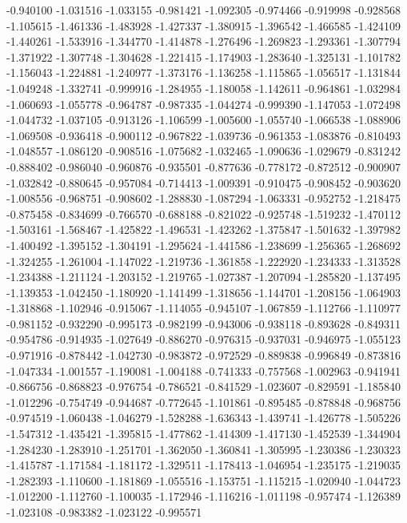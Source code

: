 -0.940100
-1.031516
-1.033155
-0.981421
-1.092305
-0.974466
-0.919998
-0.928568
-1.105615
-1.461336
-1.483928
-1.427337
-1.380915
-1.396542
-1.466585
-1.424109
-1.440261
-1.533916
-1.344770
-1.414878
-1.276496
-1.269823
-1.293361
-1.307794
-1.371922
-1.307748
-1.304628
-1.221415
-1.174903
-1.283640
-1.325131
-1.101782
-1.156043
-1.224881
-1.240977
-1.373176
-1.136258
-1.115865
-1.056517
-1.131844
-1.049248
-1.332741
-0.999916
-1.284955
-1.180058
-1.142611
-0.964861
-1.032984
-1.060693
-1.055778
-0.964787
-0.987335
-1.044274
-0.999390
-1.147053
-1.072498
-1.044732
-1.037105
-0.913126
-1.106599
-1.005600
-1.055740
-1.066538
-1.088906
-1.069508
-0.936418
-0.900112
-0.967822
-1.039736
-0.961353
-1.083876
-0.810493
-1.048557
-1.086120
-0.908516
-1.075682
-1.032465
-1.090636
-1.029679
-0.831242
-0.888402
-0.986040
-0.960876
-0.935501
-0.877636
-0.778172
-0.872512
-0.900907
-1.032842
-0.880645
-0.957084
-0.714413
-1.009391
-0.910475
-0.908452
-0.903620
-1.008556
-0.968751
-0.908602
-1.288830
-1.087294
-1.063331
-0.952752
-1.218475
-0.875458
-0.834699
-0.766570
-0.688188
-0.821022
-0.925748
-1.519232
-1.470112
-1.503161
-1.568467
-1.425822
-1.496531
-1.423262
-1.375847
-1.501632
-1.397982
-1.400492
-1.395152
-1.304191
-1.295624
-1.441586
-1.238699
-1.256365
-1.268692
-1.324255
-1.261004
-1.147022
-1.219736
-1.361858
-1.222920
-1.234333
-1.313528
-1.234388
-1.211124
-1.203152
-1.219765
-1.027387
-1.207094
-1.285820
-1.137495
-1.139353
-1.042450
-1.180920
-1.141499
-1.318656
-1.144701
-1.208156
-1.064903
-1.318868
-1.102946
-0.915067
-1.114055
-0.945107
-1.067859
-1.112766
-1.110977
-0.981152
-0.932290
-0.995173
-0.982199
-0.943006
-0.938118
-0.893628
-0.849311
-0.954786
-0.914935
-1.027649
-0.886270
-0.976315
-0.937031
-0.946975
-1.055123
-0.971916
-0.878442
-1.042730
-0.983872
-0.972529
-0.889838
-0.996849
-0.873816
-1.047334
-1.001557
-1.190081
-1.004188
-0.741333
-0.757568
-1.002963
-0.941941
-0.866756
-0.868823
-0.976754
-0.786521
-0.841529
-1.023607
-0.829591
-1.185840
-1.012296
-0.754749
-0.944687
-0.772645
-1.101861
-0.895485
-0.878848
-0.968756
-0.974519
-1.060438
-1.046279
-1.528288
-1.636343
-1.439741
-1.426778
-1.505226
-1.547312
-1.435421
-1.395815
-1.477862
-1.414309
-1.417130
-1.452539
-1.344904
-1.284230
-1.283910
-1.251701
-1.362050
-1.360841
-1.305995
-1.230386
-1.230323
-1.415787
-1.171584
-1.181172
-1.329511
-1.178413
-1.046954
-1.235175
-1.219035
-1.282393
-1.110600
-1.181869
-1.055516
-1.153751
-1.115215
-1.020940
-1.044723
-1.012200
-1.112760
-1.100035
-1.172946
-1.116216
-1.011198
-0.957474
-1.126389
-1.023108
-0.983382
-1.023122
-0.995571
